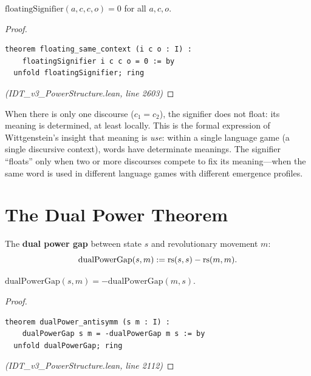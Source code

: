 \begin{theorem}
\label{thm:floating-same}
$\mathrm{floatingSignifier}(a, c, c, o) = 0$ for all $a, c, o$.
\end{theorem}

\begin{proof}
\begin{lstlisting}
theorem floating_same_context (i c o : I) :
    floatingSignifier i c c o = 0 := by
  unfold floatingSignifier; ring
\end{lstlisting}
\textit{(IDT\_v3\_PowerStructure.lean, line 2603)}
\end{proof}

\begin{interpretation}
When there is only one discourse ($c_1 = c_2$), the signifier does not float:
its meaning is determined, at least locally. This is the formal expression of
Wittgenstein's insight that meaning is \emph{use}: within a single language
game (a single discursive context), words have determinate meanings. The
signifier ``floats'' only when two or more discourses compete to fix its
meaning---when the same word is used in different language games with different
emergence profiles.
\end{interpretation}

\section{The Dual Power Theorem}

\begin{definition}
\label{def:dual-power}
The \textbf{dual power gap} between state $s$ and revolutionary movement $m$:
\[
  \mathrm{dualPowerGap}(s, m) := \mathrm{rs}(s, s) - \mathrm{rs}(m, m).
\]
\end{definition}

\begin{theorem}
\label{thm:dual-power-antisymm}
$\mathrm{dualPowerGap}(s, m) = -\mathrm{dualPowerGap}(m, s)$.
\end{theorem}

\begin{proof}
\begin{lstlisting}
theorem dualPower_antisymm (s m : I) :
    dualPowerGap s m = -dualPowerGap m s := by
  unfold dualPowerGap; ring
\end{lstlisting}
\textit{(IDT\_v3\_PowerStructure.lean, line 2112)}
\end{proof}

